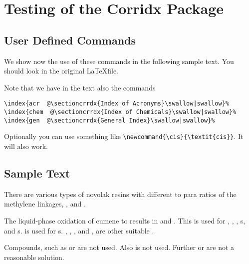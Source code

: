 \documentclass{book}
\begin{document}

\tableofcontents

 \chapter{Testing of the Corridx Package}


\section{User Defined Commands}




We show now the use of these commands in the following sample
text. You should look in the original \LaTeX\space file.

Note that we have in the text also the commands
\begin{verbatim}
\index{acr  @\sectioncrrdx{Index of Acronyms}\swallow|swallow}%
\index{chem  @\sectioncrrdx{Index of Chemicals}\swallow|swallow}%
\index{gen  @\sectioncrrdx{General Index}\swallow|swallow}%
\end{verbatim}


Optionally you can use something like
\verb"\newcommand{\cis}{\textit{cis}}". It will also work.



\newcommand{\cis}{\textit{cis}}



\section{Sample Text}

There are various types of novolak resins with different  to para ratios of the methylene linkages, ,  and .

The liquid-phase oxidation of cumene to  results in  and . This
is used for , , ,
s, and s. 
is used for s.
, , , and
, are other suitable .

Compounds, such as  or
 are not used.
Also  is not used. Further
\ib{\cis-3-hexen-1-ol}{3-HXL} or  are
not a reasonable solution.
\end{document}
